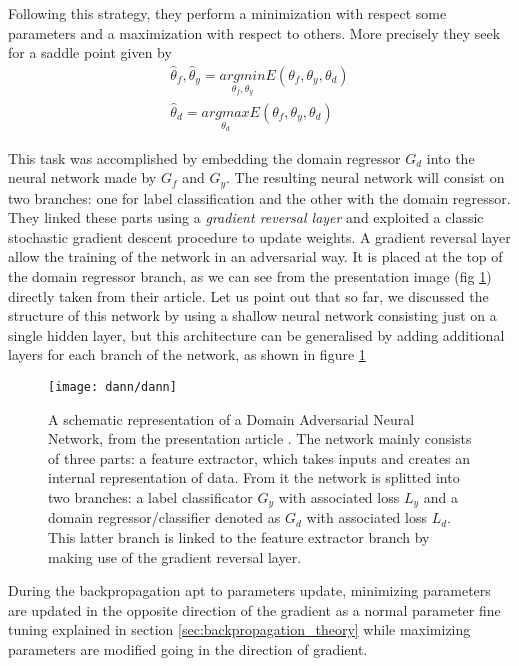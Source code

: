 \documentclass[10pt]{report}
\begin{document}
Following this strategy, they perform a minimization with respect some parameters and a maximization with respect to others. More precisely they seek for a saddle point given by
\begin{equation}
\begin{split}
\hat \theta_f, \hat \theta_y = \underset{\theta_f, \theta_y}{argmin} E(\theta_f, \theta_y, \theta_d) \\
\hat \theta_d = \underset{\theta_d}{argmax} E(\theta_f, \theta_y, \theta_d)
\end{split}
\end{equation}

This task was accomplished by embedding the domain regressor $G_d$ into the neural network made by $G_f$ and $G_y$. The resulting neural network will consist on two branches: one for label classification and the other with the domain regressor.
They linked these parts using a \emph{gradient reversal layer} and exploited a classic stochastic gradient descent procedure to update weights.
A gradient reversal layer allow the training of the network in an adversarial way. It is placed at the top of the domain regressor branch, as we can see from the presentation image (fig \ref{fig:dann_original}) directly taken from their article.
Let us point out that so far, we discussed the structure of this network by using a shallow neural network consisting just on a single hidden layer, but this architecture can be generalised by adding additional layers for each branch of the network, as shown in figure \ref{fig:dann_original}


\begin{figure}[h]
\centering
\texttt{[image: dann/dann]}
\caption{A schematic representation of a Domain Adversarial Neural Network, from the presentation article \cite{ganin2016}. The network mainly consists of three parts: a feature extractor, which takes inputs and creates an internal representation of data. From it the network is splitted into two branches: a label classificator $G_y$ with associated loss $L_y$ and a domain regressor/classifier denoted as $G_d$ with associated loss $L_d$. This latter branch is linked to the feature extractor branch by making use of the gradient reversal layer.
}\label{fig:dann_original}
\end{figure}




During the backpropagation apt to parameters update, minimizing parameters are updated in the opposite direction of the gradient as a normal parameter fine tuning explained in section \ref{sec:backpropagation_theory} while maximizing parameters are modified going in the direction of gradient.
\end{document}
